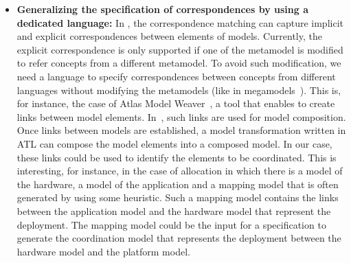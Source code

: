 \begin{itemize}
	\item \textbf{Generalizing the specification of correspondences by using a dedicated language:} In \bcool, the correspondence matching can capture implicit and explicit correspondences between elements of models. Currently, the explicit correspondence is only supported if one of the metamodel is modified to refer concepts from a different metamodel. To avoid such modification, we need a language to specify correspondences between concepts from different languages without modifying the metamodels (\eg like in megamodels~\cite{bezivinmegamodels}). This is, for instance, the case of Atlas Model Weaver~\cite{amwbib}, a tool that enables to create links between model elements. In~\cite{amwcompobib}, such links are used for model composition. Once links between models are established, a model transformation written in ATL can compose the model elements into a composed model. In our case, these links could be used to identify the elements to be coordinated. This is interesting, for instance, in the case of allocation in which there is a model of the hardware, a model of the application and a mapping model that is often generated by using some heuristic. Such a mapping model contains the links between the application model and the hardware model that represent the deployment. The mapping model could be the input for a \bcool specification to generate the coordination model that represents the deployment between the hardware model and the platform model.
	

\end{itemize}

